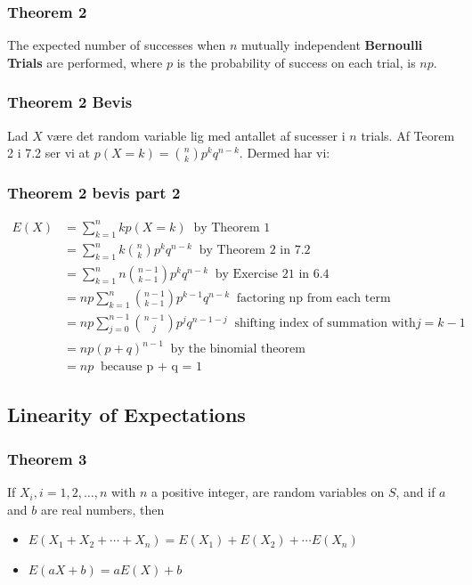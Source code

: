 \documentclass{beamer}
\begin{document}
\begin{frame}
  \frametitle{Theorem 2}
 \begin{theorem}
The expected number of successes when $n$ mutually independent \textbf{Bernoulli Trials} are performed, where $p$ is the probability of success on each trial, is $np$.
 \end{theorem} 
\end{frame}

\begin{frame}
  \frametitle{Theorem 2 Bevis}
  Lad $X$  være det random variable lig med antallet af sucesser i $n$ trials. Af Teorem 2 i 7.2 ser vi at $p(X=k) = \binom{n}{k}p^{k}q^{n-k}$. Dermed har vi:

\end{frame}

\begin{frame}
  \frametitle{Theorem 2 bevis part 2}
  \begin{equation*}
    \begin{split}
      E(X) &= \sum_{k=1}^{n}kp(X=k) \;\; \text{by Theorem 1}\\
           &= \sum_{k=1}^{n}k \binom{n}{k}p^{k}q^{n-k} \;\; \text{by Theorem 2 in 7.2}\\
           &= \sum_{k=1}^{n} n \binom{n-1}{k-1}p^{k} q^{n-k} \; \; \text{by Exercise 21 in 6.4}\\
           &= np\sum_{k=1}^{n} \binom{n-1}{k-1}p^{k-1}q^{n-k} \; \; \text{factoring np from each term} \\
           &= np \sum_{j=0}^{n-1} \binom{n-1}{j}p^{j}q^{n-1-j}\;\; \text{shifting index of summation with} j = k - 1\\
            &= np(p+q)^{n-1} \;\; \text{by the binomial theorem}\\
           &= np \;\; \text{because p + q = 1}
    \end{split}
  \end{equation*}
\end{frame}

\subsection{Linearity of Expectations}
\label{subsec:linexp}

\begin{frame}
  \frametitle{Theorem 3}
  \begin{theorem}
    If $X_i, i = 1, 2, \ldots, n$ with $n$ a positive integer, are random variables on $S$, and if $a$ and $b$ are real numbers, then
    \begin{itemize}
    \item $E(X_{1}+X_{2}+ \cdots + X_{n}) = E(X_{1})+ E(X_{2})+ \cdots E(X_{n})$
    \item $E(aX+b) = aE(X)+b$
    \end{itemize}
  \end{theorem}
\end{frame}
\end{document}
